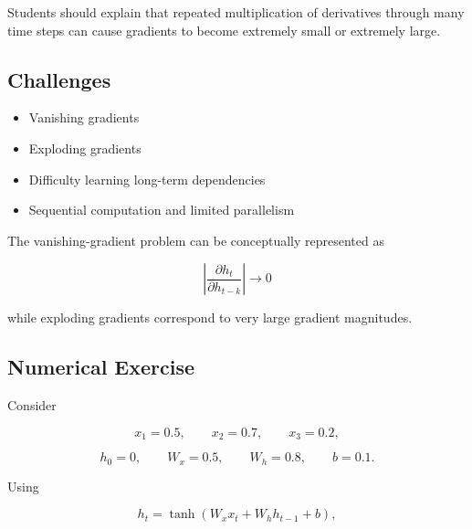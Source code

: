\documentclass[10pt]{article}
\begin{document}
\begin{center}
\end{center}

Students should explain that repeated multiplication of derivatives through
many time steps can cause gradients to become extremely small or extremely
large.

\subsection*{Challenges}

\begin{itemize}
\item Vanishing gradients
\item Exploding gradients
\item Difficulty learning long-term dependencies
\item Sequential computation and limited parallelism
\end{itemize}

The vanishing-gradient problem can be conceptually represented as

\[
\left|\frac{\partial h_t}{\partial h_{t-k}}\right|\rightarrow0
\]

while exploding gradients correspond to very large gradient magnitudes.

\subsection*{Numerical Exercise}

Consider

\[
x_1=0.5,\qquad x_2=0.7,\qquad x_3=0.2,
\]

\[
h_0=0,\qquad W_x=0.5,\qquad W_h=0.8,\qquad b=0.1.
\]

Using

\[
h_t=\tanh(W_xx_t+W_hh_{t-1}+b),
\]
\end{document}
